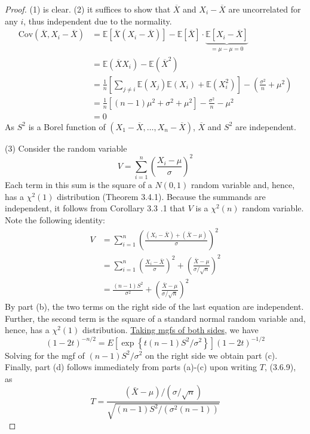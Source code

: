 \begin{proof}

(1) is clear. (2) it suffices to show that $\overline{X}$ and $X_i-\overline{X}$ are uncorrelated for any $i$, thus independent due to the normality.
\[
\begin{aligned}
\mathrm{Cov}(\overline{X},X_i-\overline{X}) & = \mathbb{E}[\overline{X}(X_i-\overline{X})]-\mathbb{E}[\overline{X}]\cdot\underbrace{ \mathbb{E}[X_i-\overline{X}] }_{ =\mu-\mu=0 } \\
 & =\mathbb{E}(\overline{X}X_i)-\mathbb{E}(\overline{X}^{2} ) \\
 & =\frac{1}{n}\left[ \sum_{j\neq i}\mathbb{E}(X_j)\mathbb{E}(X_i)+\mathbb{E}(X_i^{2}) \right]-\left( \frac{\sigma^{2}}{n}+\mu^{2} \right) \\
 & =\frac{1}{n}[(n-1)\mu^{2}+\sigma^{2}+\mu^{2}]-\frac{\sigma^{2}}{n}-\mu^{2} \\
 & =0
\end{aligned}
\]
As $S^{2}$ is a Borel function of $(X_1-\overline{X},\dots,X_n-\overline{X})$, $\overline{X}$ and $S^{2}$ are independent.

(3) Consider the random variable
\[
V=\sum_{i=1}^n\left(\frac{X_i-\mu}{\sigma}\right)^2
\]
Each term in this sum is the square of a $N(0,1)$ random variable and, hence, has a $\chi^2(1)$ distribution (Theorem 3.4.1). Because the summands are independent, it follows from Corollary 3.3 .1 that $V$ is a $\chi^2(n)$ random variable. Note the following identity:
\[
\begin{aligned}
V & =\sum_{i=1}^n\left(\frac{\left(X_i-\bar{X}\right)+(\bar{X}-\mu)}{\sigma}\right)^2 \\
& =\sum_{i=1}^n\left(\frac{X_i-\bar{X}}{\sigma}\right)^2+\left(\frac{\bar{X}-\mu}{\sigma / \sqrt{n}}\right)^2 \\
& =\frac{(n-1) S^2}{\sigma^2}+\left(\frac{\bar{X}-\mu}{\sigma / \sqrt{n}}\right)^2
\end{aligned}
\]
By part (b), the two terms on the right side of the last equation are independent. Further, the second term is the square of a standard normal random variable and, hence, has a $\chi^2(1)$ distribution. \underline{Taking mgfs of both sides}, we have
\[
(1-2 t)^{-n / 2}=E\left[\exp \left\{t(n-1) S^2 / \sigma^2\right\}\right](1-2 t)^{-1 / 2}
\]
Solving for the mgf of $(n-1) S^2 / \sigma^2$ on the right side we obtain part (c). Finally, part (d) follows immediately from parts (a)-(c) upon writing $T$, (3.6.9), as
\[
T=\frac{(\bar{X}-\mu) /(\sigma / \sqrt{n})}{\sqrt{(n-1) S^2 /\left(\sigma^2(n-1)\right)}}
\]
\end{proof}

